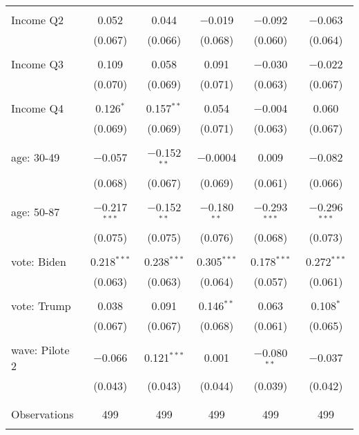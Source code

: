 \begin{tabular}{@{\extracolsep{5pt}}lccccc}
  & & & & & \\ 
 Income Q2 & 0.052 & 0.044 & $-$0.019 & $-$0.092 & $-$0.063 \\ 
  & (0.067) & (0.066) & (0.068) & (0.060) & (0.064) \\ 
  & & & & & \\ 
 Income Q3 & 0.109 & 0.058 & 0.091 & $-$0.030 & $-$0.022 \\ 
  & (0.070) & (0.069) & (0.071) & (0.063) & (0.067) \\ 
  & & & & & \\ 
 Income Q4 & 0.126$^{*}$ & 0.157$^{**}$ & 0.054 & $-$0.004 & 0.060 \\ 
  & (0.069) & (0.069) & (0.071) & (0.063) & (0.067) \\ 
  & & & & & \\ 
 age: 30-49 & $-$0.057 & $-$0.152$^{**}$ & $-$0.0004 & 0.009 & $-$0.082 \\ 
  & (0.068) & (0.067) & (0.069) & (0.061) & (0.066) \\ 
  & & & & & \\ 
 age: 50-87 & $-$0.217$^{***}$ & $-$0.152$^{**}$ & $-$0.180$^{**}$ & $-$0.293$^{***}$ & $-$0.296$^{***}$ \\ 
  & (0.075) & (0.075) & (0.076) & (0.068) & (0.073) \\ 
  & & & & & \\ 
 vote: Biden & 0.218$^{***}$ & 0.238$^{***}$ & 0.305$^{***}$ & 0.178$^{***}$ & 0.272$^{***}$ \\ 
  & (0.063) & (0.063) & (0.064) & (0.057) & (0.061) \\ 
  & & & & & \\ 
 vote: Trump & 0.038 & 0.091 & 0.146$^{**}$ & 0.063 & 0.108$^{*}$ \\ 
  & (0.067) & (0.067) & (0.068) & (0.061) & (0.065) \\ 
  & & & & & \\ 
 wave: Pilote 2 & $-$0.066 & 0.121$^{***}$ & 0.001 & $-$0.080$^{**}$ & $-$0.037 \\ 
  & (0.043) & (0.043) & (0.044) & (0.039) & (0.042) \\ 
  & & & & & \\ 
\hline \\[-1.8ex] 

Observations & 499 & 499 & 499 & 499 & 499 \\ 
\hline 
\hline \\[-1.8ex] 
\end{tabular} 